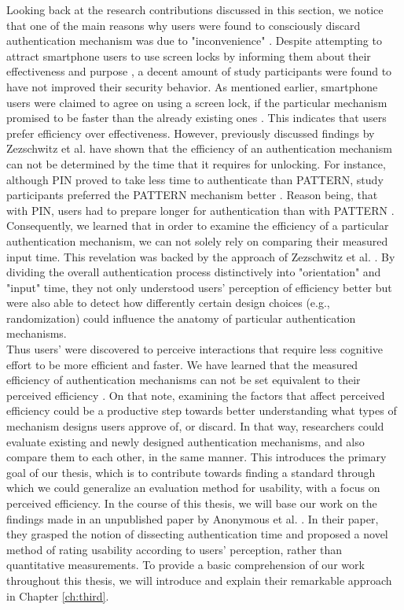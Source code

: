 Looking back at the research contributions discussed in this section, we notice that one of the main reasons why users were found to consciously discard authentication mechanism was due to "inconvenience" \cite{Albayram:2017:BUL:3235924.3235929, Harbach:2016, Alsaleh}. Despite attempting to attract smartphone users to use screen locks by informing them about their effectiveness and purpose \cite{Albayram:2017:BUL:3235924.3235929}, a decent amount of study participants were found to have not improved their security behavior. As mentioned earlier, smartphone users were claimed to agree on using a screen lock, if the particular mechanism promised to be faster than the already existing ones \cite{AnatomySmartphone}. This indicates that users prefer efficiency over effectiveness. However, previously discussed findings by Zezschwitz et al. \cite{PatternWild} have shown that the efficiency of an authentication mechanism can not be determined by the time that it requires for unlocking. For instance, although PIN proved to take less time to authenticate than PATTERN, study participants preferred the PATTERN mechanism better \cite{PatternWild}. Reason being, that with PIN, users had to prepare longer for authentication than with PATTERN \cite{AnatomySmartphone}. Consequently, we learned that in order to examine the efficiency of a particular authentication mechanism, we can not solely rely on comparing their measured input time. This revelation was backed by the approach of Zezschwitz et al. \cite{Marbles}. By dividing the overall authentication process distinctively into "orientation" and "input" time, they not only understood users' perception of efficiency better but were also able to detect how differently certain design choices (e.g., randomization) could influence the anatomy of particular authentication mechanisms. \\

Thus users' were discovered to perceive interactions that require less cognitive effort to be more efficient and faster. We have learned that the measured efficiency of authentication mechanisms can not be set equivalent to their perceived efficiency \cite{anonymous}. On that note, examining the factors that affect perceived efficiency could be a productive step towards better understanding what types of mechanism designs users approve of, or discard. In that way, researchers could evaluate existing and newly designed authentication mechanisms, and also compare them to each other, in the same manner. This introduces the primary goal of our thesis, which is to contribute towards finding a standard through which we could generalize an evaluation method for usability, with a focus on perceived efficiency. In the course of this thesis, we will base our work on the findings made in an unpublished paper by Anonymous et al. \cite{anonymous}. In their paper, they grasped the notion of dissecting authentication time and proposed a novel method of rating usability according to users' perception, rather than quantitative measurements. To provide a basic comprehension of our work throughout this thesis, we will introduce and explain their remarkable approach in Chapter \ref{ch:third}. 






